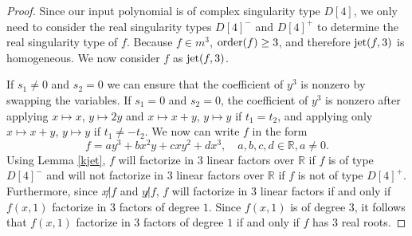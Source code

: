 \documentclass{amsproc}
\begin{document}
\begin{proof}
Since our input polynomial is of complex singularity type $D[4]$, we only need to consider the real singularity types $D[4]^-$ and $D[4]^+$ to determine the real singularity type of $f$. Because $f\in m^3$, $\textnormal{order}(f)\ge3$, and therefore $\textnormal{jet}(f,3)$ is homogeneous. We now consider $f$ as $\textnormal{jet}(f,3)$. 

If $s_1\neq 0$ and $s_2=0$ we can ensure that the coefficient of $y^3$ is nonzero by swapping the variables. If $s_1=0$ and $s_2=0$, the coefficient of $y^3$ is nonzero after applying $x\mapsto x$, $y\mapsto 2y$ and $x\mapsto x+y$, $y\mapsto y$ if $t_1=t_2$, and applying only $x\mapsto x+y$, $y\mapsto y$ if $t_1\neq -t_2$. We now can write $f$ in the form
\begin{equation*}
f=ay^3+bx^2y+cxy^2+dx^3,\quad a,b,c,d\in\mathbb R, a\neq 0.
\end{equation*}
Using Lemma \ref{kjet}, $f$ will factorize in $3$ linear factors over $\mathbb R$ if $f$ is of type $D[4]^-$ and will not factorize in $3$ linear factors over $\mathbb R$ if $f$ is not of type $D[4]^+$. Furthermore, since $x\not | f$ and $y\not | f$, $f$ will factorize in $3$ linear factors if and only if $f(x,1)$ factorize in $3$  factors of degree $1$. Since $f(x,1)$ is of degree $3$, it follows that $f(x,1)$ factorize in $3$ factors of degree $1$ if and only if $f$ has $3$ real roots.


\end{proof}
\end{document}
